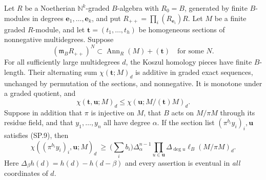 \begin{lemma}
\label{claim:SP2}
Let $R$ be a Noetherian $\mathbb N^k$-graded $B$-algebra with
$R_0=B$, generated by finite $B$-modules in degrees
$\mathbf e_1,\ldots,\mathbf e_k$, and put
$R_{++}=\prod_i(R_{\mathbf e_i})R$.  Let $M$ be a finite graded
$R$-module, and let $\mathbf t=(t_1,\ldots,t_h)$ be homogeneous
sections of nonnegative multidegrees.  Suppose
\[
        (\mathfrak m_BR_{++})^N
                  \subset\operatorname{Ann}_R(M)+(\mathbf t)
                  \quad\text{for some }N.
 \tag{SP.9}
\]
For all sufficiently large multidegrees $d$, the Koszul homology
pieces have finite $B$-length.  Their alternating sum
$\chi(\mathbf t;M)_d$ is additive in graded exact sequences,
unchanged by permutation of the sections, and nonnegative.  It is
monotone under a graded quotient, and
\[
 \chi(\mathbf t,\mathbf u;M)_d
                 \le\chi(\mathbf u;M/(\mathbf t)M)_d.
 \tag{SP.10}
\]
Suppose in addition that $\pi$ is injective on $M$, that $B$ acts on
$M/\pi M$ through its residue field, and that $y_1,\ldots,y_n$ all
have degree $\alpha$.  If the section list
$(\pi^{b_i}y_i)_i,\mathbf u$ satisfies (SP.9), then
\[
 \chi((\pi^{b_i}y_i)_i,\mathbf u;M)_d
 \ \ge\ \Big(\sum_i b_i\Big)
       \Delta_\alpha^{n-1}\prod_{u\in\mathbf u}\Delta_{\deg u}
                  \ell_B(M/\pi M)_d .
 \tag{SP.11}
\]
Here $\Delta_\beta h(d)=h(d)-h(d-\beta)$ and every assertion is
eventual in \emph{all} coordinates of $d$.
\end{lemma}

